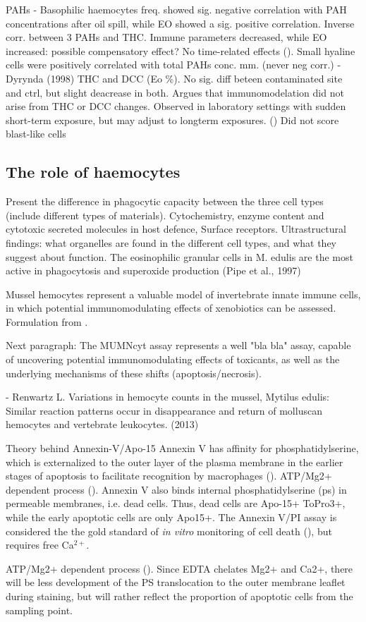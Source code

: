   PAHs
- Basophilic haemocytes freq. showed sig. negative correlation with PAH concentrations after oil spill, while EO showed a sig. positive correlation. Inverse corr. between 3 PAHs and THC. Immune parameters decreased, while EO increased: possible compensatory effect? No time-related effects (\cite{Dyrynda1997}). Small hyaline cells were positively correlated with total PAHs conc. mm. (never neg corr.) %
- Dyrynda (1998) THC and DCC (Eo \%). No sig. diff beteen contaminated site and ctrl, but slight deacrease in both. Argues that immunomodelation did not arise from THC or DCC changes. Observed in laboratory settings with sudden short-term exposure, but may adjust to longterm exposures.  (\cite{Dyrynda1998}) Did not score blast-like cells %

\subsection{The role of haemocytes}
Present the difference in phagocytic capacity between the three cell types (include different types of materials).
Cytochemistry, enzyme content and cytotoxic secreted molecules in host defence, Surface receptors.
Ultrastructural findings: what organelles are found in the different cell types, and what they suggest about function.
The  eosinophilic granular cells in  M. edulis are the most active in phagocytosis and superoxide production (Pipe  et al., 1997)

Mussel hemocytes represent a valuable model of invertebrate innate immune cells, in which potential immunomodulating effects of xenobiotics can be assessed. Formulation from \cite{Rioult2014}.

Next paragraph: The MUMNcyt assay represents a well "bla bla" assay, capable of uncovering potential immunomodulating effects of toxicants, as well as the underlying mechanisms of these shifts (apoptosis/necrosis). 

- Renwartz L. Variations in hemocyte counts in the mussel, Mytilus edulis: Similar reaction patterns occur in disappearance and return of molluscan hemocytes and vertebrate leukocytes. (2013)

Theory behind Annexin-V/Apo-15 Annexin V has affinity for phosphatidylserine, which is externalized to the outer layer of the plasma membrane in the earlier stages of apoptosis to facilitate recognition by macrophages (\cite{Fadok1992}). ATP/Mg2+ dependent process (\cite{Connor1992}). Annexin V also binds internal phosphatidylserine (\acrshort{ps}) in permeable membranes, i.e. dead cells. Thus, dead cells are Apo-15+ ToPro3+, while the early apoptotic cells are only Apo15+. The Annexin V/PI assay is considered the the gold standard of \emph{in vitro} monitoring of cell death (\cite{Jiang2016}), but requires free Ca$^{2+}$.

ATP/Mg2+ dependent process (\cite{Connor1992}). Since EDTA chelates Mg2+ and Ca2+, there will be less development of the PS translocation to the outer membrane leaflet during staining, but will rather reflect the proportion of apoptotic cells from the sampling point.